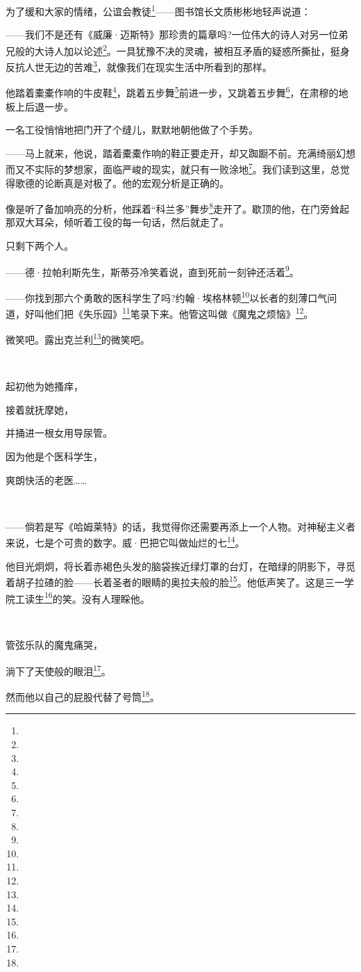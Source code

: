 \par 为了缓和大家的情绪，公谊会教徒\footnote{}——图书馆长文质彬彬地轻声说道：
\par ——我们不是还有《威廉·迈斯特》那珍贵的篇章吗?一位伟大的诗人对另一位弟兄般的大诗人加以论述\footnote{}。一具犹豫不决的灵魂，被相互矛盾的疑惑所撕扯，挺身反抗人世无边的苦难\footnote{}，就像我们在现实生活中所看到的那样。
\par 他踏着橐橐作响的牛皮鞋\footnote{}，跳着五步舞\footnote{}前进一步，又跳着五步舞\footnote{}，在肃穆的地板上后退一步。
\par 一名工役悄悄地把门开了个缝儿，默默地朝他做了个手势。
\par ——马上就来，他说，踏着橐橐作响的鞋正要走开，却又踟蹰不前。充满绮丽幻想而又不实际的梦想家，面临严峻的现实，就只有一败涂地\footnote{}。我们读到这里，总觉得歌德的论断真是对极了。他的宏观分析是正确的。
\par 像是听了备加响亮的分析，他踩着“科兰多”舞步\footnote{}走开了。歇顶的他，在门旁耸起那双大耳朵，倾听着工役的每一句话，然后就走了。
\par 只剩下两个人。
\par ——德·拉帕利斯先生，斯蒂芬冷笑着说，直到死前一刻钟还活着\footnote{}。
\par ——你找到那六个勇敢的医科学生了吗?约翰·埃格林顿\footnote{}以长者的刻薄口气问道，好叫他们把《失乐园》\footnote{}笔录下来。他管这叫做《魔鬼之烦恼》\footnote{}。
\par 微笑吧。露出克兰利\footnote{}的微笑吧。
\par  
\par 起初他为她搔痒，
\par 接着就抚摩她，
\par 并捅进一根女用导尿管。
\par 因为他是个医科学生，
\par 爽朗快活的老医……
\par  
\par ——倘若是写《哈姆莱特》的话，我觉得你还需要再添上一个人物。对神秘主义者来说，七是个可贵的数字。威·巴把它叫做灿烂的七\footnote{}。
\par 他目光炯炯，将长着赤褐色头发的脑袋挨近绿灯罩的台灯，在暗绿的阴影下，寻觅着胡子拉碴的脸——长着圣者的眼睛的奥拉夫般的脸\footnote{}。他低声笑了。这是三一学院工读生\footnote{}的笑。没有人理睬他。
\par  
\par 管弦乐队的魔鬼痛哭，
\par 淌下了天使般的眼泪\footnote{}。
\par 然而他以自己的屁股代替了号筒\footnote{}。
